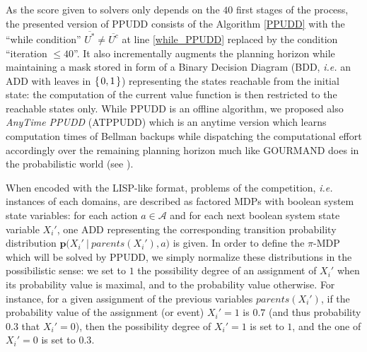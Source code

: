 As the score given to solvers only depends on the $40$ first stages of the process,
the presented version of PPUDD consists of the Algorithm \ref{PPUDD} 
with the ``while condition'' $\overline{U^*} \neq \overline{U^c}$ at line \ref{while_PPUDD}
replaced by the condition ``iteration $\leqslant 40$''.
It also incrementally augments the planning
horizon while maintaining a mask stored in form of 
a Binary Decision Diagram (BDD, \textit{i.e.} an ADD with leaves in $\left\{ \left. 0,1 \right. \right\}$) 
representing the states reachable from the initial state:
the computation of the current value function is then restricted
to the reachable states only. While PPUDD is an offline algorithm,
we proposed also \textit{AnyTime PPUDD} (ATPPUDD) 
which is an anytime version which learns computation times of
Bellman backups while dispatching the computational effort accordingly
over the remaining planning horizon much like GOURMAND does in the
probabilistic world (see \cite{DBLP:conf/aaai/KolobovMW12}). 

When encoded with the LISP-like format, 
problems of the competition, \textit{i.e.} instances of each domains, 
are described as factored MDPs
with boolean system state variables: 
for each action $a \in \mathcal{A}$ and for each next boolean system state variable $X_i'$, 
one ADD representing the corresponding transition probability distribution
$\textbf{p} \Big( X_i' \ \Big\vert \ parents(X_i'), a \Big)$ is given.
In order to define the $\pi$-MDP which will be solved by PPUDD,
we simply normalize these distributions in the possibilistic sense:
we set to $1$ the possibility degree of an assignment of $X_i'$ when 
its probability value is maximal, and to the probability value otherwise.
For instance, for a given assignment of the previous variables $parents(X_i')$, 
if the probability value of the assignment (or event) $X_i'=1$ is $0.7$ 
(and thus probability $0.3$ that $X_i' = 0$), 
then the possibility degree of $X_i'=1$ is set to $1$,
and the one of $X_i' = 0$ is set to $0.3$.

